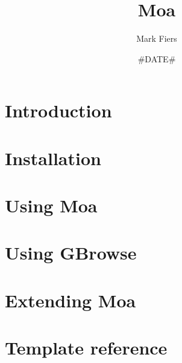 \documentclass[a4paper,11pt,oneside]{report}
\begin{document}

\title{Moa}
\author{Mark Fiers}
\date{#DATE#}

\begin{titlepage}
\vfill
{}
\vfill
\vfill
{}
\end{titlepage}
\tableofcontents

\chapter{Introduction\label{ch:introduction}}

\chapter{Installation\label{ch:installation}}

\chapter{Using Moa\label{ch:using}}

\chapter{Using GBrowse\label{ch:gbrowse}}

\chapter{Extending Moa\label{ch:extending}}

\appendix
\chapter{Template reference\label{ch:templateref}}



\end{document}
